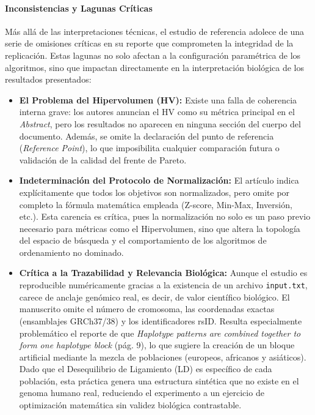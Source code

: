 \documentclass[a4paper,10pt]{article}
\begin{document}
\paragraph{Inconsistencias y Lagunas Críticas}
Más allá de las interpretaciones técnicas, el estudio de referencia adolece de una serie de omisiones críticas en su reporte que comprometen la integridad de la replicación. Estas lagunas no solo afectan a la configuración paramétrica de los algoritmos, sino que impactan directamente en la interpretación biológica de los resultados presentados:

\begin{itemize}
    \item \textbf{El Problema del Hipervolumen (HV):} Existe una falla de coherencia interna grave: los autores anuncian el HV como su métrica principal en el \textit{Abstract}, pero los resultados no aparecen en ninguna sección del cuerpo del documento. Además, se omite la declaración del punto de referencia (\textit{Reference Point}), lo que imposibilita cualquier comparación futura o validación de la calidad del frente de Pareto.
    \item \textbf{Indeterminación del Protocolo de Normalización:} El artículo indica explícitamente que \guillemotleft todos los objetivos son normalizados\guillemotright, pero omite por completo la fórmula matemática empleada (Z-score, Min-Max, Inversión, etc.). Esta carencia es crítica, pues la normalización no solo es un paso previo necesario para métricas como el Hipervolumen, sino que altera la topología del espacio de búsqueda y el comportamiento de los algoritmos de ordenamiento no dominado.
    \item \textbf{Crítica a la Trazabilidad y Relevancia Biológica:} Aunque el estudio es reproducible numéricamente gracias a la existencia de un archivo \texttt{input.txt}, carece de anclaje genómico real, es decir, de valor científico biológico. El manuscrito omite el número de cromosoma, las coordenadas exactas (ensamblajes GRCh37/38) y los identificadores rsID. Resulta especialmente problemático el reporte de que \textit{\guillemotleft Haplotype patterns are combined together to form one haplotype block\guillemotright} (pág. 9), lo que sugiere la creación de un bloque artificial mediante la mezcla de poblaciones (europeos, africanos y asiáticos). Dado que el Desequilibrio de Ligamiento (LD) es específico de cada población, esta práctica genera una estructura sintética que no existe en el genoma humano real, reduciendo el experimento a un ejercicio de optimización matemática sin validez biológica contrastable.

\end{itemize}
\end{document}

